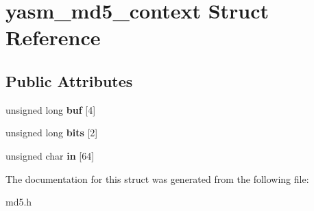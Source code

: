 \hypertarget{structyasm__md5__context}{\section{yasm\-\_\-md5\-\_\-context Struct Reference}
\label{structyasm__md5__context}
}
\subsection*{Public Attributes}
\begin{DoxyCompactItemize}
\item 
\hypertarget{structyasm__md5__context_a586549f66350413aa386fa08ce5b6a75}{unsigned long {\bfseries buf} \mbox{[}4\mbox{]}}\label{structyasm__md5__context_a586549f66350413aa386fa08ce5b6a75}

\item 
\hypertarget{structyasm__md5__context_aec7f36a6a984e8c18f5ea91d45570efc}{unsigned long {\bfseries bits} \mbox{[}2\mbox{]}}\label{structyasm__md5__context_aec7f36a6a984e8c18f5ea91d45570efc}

\item 
\hypertarget{structyasm__md5__context_aded9f795cd67e7c8f630229ed505cb11}{unsigned char {\bfseries in} \mbox{[}64\mbox{]}}\label{structyasm__md5__context_aded9f795cd67e7c8f630229ed505cb11}

\end{DoxyCompactItemize}


The documentation for this struct was generated from the following file\-:\begin{DoxyCompactItemize}
\item 
md5.\-h\end{DoxyCompactItemize}
